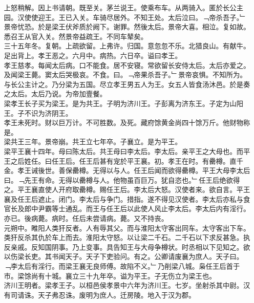 \documentclass{zhvt-classic}
\begin{document}
\hspace*{2em}上怒稍解。因上书请朝。既至关。茅兰说王。使乘布车。从两骑入。匿於长公主园。汉使使迎王。王已入关。车骑尽居外。不知王处。太后泣曰。﹁帝杀吾子。﹂景帝忧恐。於是梁王伏斧质於阙下。谢罪。然後太后。景帝大喜。相泣。复如故。悉召王从官入关。然景帝益疏王。不同车辇矣。\\
\hspace*{2em}三十五年冬。复朝。上疏欲留。上弗许。归国。意忽忽不乐。北猎良山。有献牛。足出背上。孝王恶之。六月中。病热。六日卒。谥曰孝王。\\
\hspace*{2em}孝王慈孝。每闻太后病。口不能食。居不安寝。常欲留长安侍太后。太后亦爱之。及闻梁王薨。窦太后哭极哀。不食。曰。﹁帝果杀吾子。﹂景帝哀惧。不知所为。与长公主计之。乃分梁为五国。尽立孝王男五人为王。女五人皆食汤沐邑。於是奏之太后。太后乃说。为帝加壹餐。\\
\hspace*{2em}梁孝王长子买为梁王。是为共王。子明为济川王。子彭离为济东王。子定为山阳王。子不识为济阴王。\\
\hspace*{2em}孝王未死时。财以巨万计。不可胜数。及死。藏府馀黄金尚四十馀万斤。他财物称是。\\
\hspace*{2em}梁共王三年。景帝崩。共王立七年卒。子襄立。是为平王。\\
\hspace*{2em}梁平王襄十四年。母曰陈太后。共王母曰李太后。李太后。亲平王之大母也。而平王之后姓任。曰任王后。任王后甚有宠於平王襄。初。孝王在时。有罍樽。直千金。孝王诫後世。善保罍樽。无得以与人。任王后闻而欲得罍樽。平王大母李太后曰。﹁先王有命。无得以罍樽与人。他物虽百巨万。犹自恣也。﹂任王后绝欲得之。平王襄直使人开府取罍樽。赐任王后。李太后大怒。汉使者来。欲自言。平王襄及任王后遮止。闭门。李太后与争门。措指。遂不得见汉使者。李太后亦私与食官长及郎中尹霸等士通乱。而王与任王后以此使人风止李太后。李太后内有淫行。亦已。後病薨。病时。任后未尝请病。薨。又不持丧。\\
\hspace*{2em}元朔中。睢阳人类犴反者。人有辱其父。而与淮阳太守客出同车。太守客出下车。类犴反杀其仇於车上而去。淮阳太守怒。以让梁二千石。二千石以下求反甚急。执反亲戚。反知国阴事。乃上变事。具告知王与大母争樽状。时丞相以下见知之。欲以伤梁长吏。其书闻天子。天子下吏验问。有之。公卿请废襄为庶人。天子曰。﹁李太后有淫行。而梁王襄无良师傅。故陷不义。﹂乃削梁八城。枭任王后首于市。梁馀尚有十城。襄立三十九年卒。谥为平王。子无伤立为梁王也。\\
\hspace*{2em}济川王明者。梁孝王子。以桓邑侯孝景中六年为济川王。七岁。坐射杀其中尉。汉有司请诛。天子弗忍诛。废明为庶人。迁房陵。地入于汉为郡。\\
\end{document}
